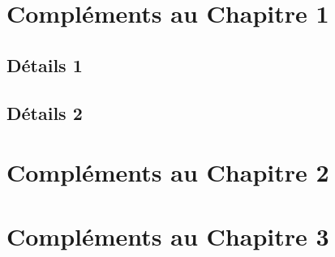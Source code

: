 
\appendix

\chapter{Compléments au Chapitre 1}
\section{Détails 1}\label{append:app}
\section{Détails 2}\label{append:subAPP}

\chapter{Compléments au Chapitre 2}\label{sec:annCCSDS}
\chapter{Compléments au Chapitre 3}\label{sec:ann3}
